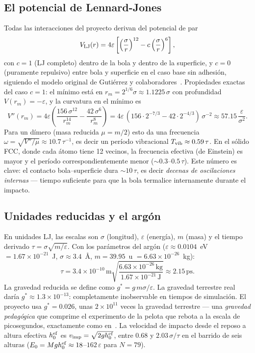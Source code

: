 \documentclass[11pt,a4paper]{article}
\newcommand{\eps}{\varepsilon}
\begin{document}
\subsection{El potencial de Lennard-Jones}
Todas las interacciones del proyecto derivan del potencial de par
\begin{equation}
V_{\rm LJ}(r) = 4\eps\left[\left(\frac{\sigma}{r}\right)^{12}
- c\left(\frac{\sigma}{r}\right)^{6}\right],
\label{eq:lj}
\end{equation}
con $c=1$ (LJ completo) dentro de la bola y dentro de la superficie, y
$c=0$ (puramente repulsivo) entre bola y superficie en el caso base sin
adhesión, siguiendo el modelo original de Gutiérrez y
colaboradores~\cite{Gutierrez2012}. Propiedades exactas del caso $c=1$:
el mínimo está en $r_m = 2^{1/6}\sigma \approx 1.1225\,\sigma$ con
profundidad $V(r_m) = -\eps$, y la curvatura en el mínimo es
\begin{equation}
V''(r_m) = 4\eps\left(\frac{156\,\sigma^{12}}{r_m^{14}}
- \frac{42\,\sigma^{6}}{r_m^{8}}\right)
= 4\eps\,(156\cdot 2^{-7/3} - 42\cdot 2^{-4/3})\,\sigma^{-2}
\approx 57.15\,\frac{\eps}{\sigma^2}.
\label{eq:curvatura}
\end{equation}
Para un dímero (masa reducida $\mu = m/2$) esto da una frecuencia
$\omega = \sqrt{V''/\mu} \approx 10.7\,\tau^{-1}$, es decir un período
vibracional $T_{\rm vib} \approx 0.59\,\tau$. En el sólido FCC, donde cada
átomo tiene 12 vecinos, la frecuencia efectiva (de Einstein) es mayor y el
período correspondientemente menor ($\sim0.3$--$0.5\,\tau$). Este número es
clave: el contacto bola--superficie dura $\sim10\,\tau$, es decir
\emph{decenas de oscilaciones internas} --- tiempo suficiente para que la
bola termalice internamente durante el impacto.

\subsection{Unidades reducidas y el argón}
En unidades LJ, las escalas son $\sigma$ (longitud), $\eps$ (energía),
$m$ (masa) y el tiempo derivado $\tau = \sigma\sqrt{m/\eps}$. Con los
parámetros del argón ($\eps \approx 0.0104$~eV $= 1.67\times10^{-21}$~J,
$\sigma \approx 3.4$~\AA, $m = 39.95$~u $= 6.63\times10^{-26}$~kg):
\begin{equation}
\tau = 3.4\times10^{-10}\,\text{m}
\sqrt{\frac{6.63\times10^{-26}\,\text{kg}}{1.67\times10^{-21}\,\text{J}}}
\approx 2.15\,\text{ps}.
\end{equation}
La gravedad reducida se define como $g^* = g\,m\sigma/\eps$. La gravedad
terrestre real daría $g^* \approx 1.3\times10^{-13}$: completamente
inobservable en tiempos de simulación. El proyecto usa $g^* = 0.026$, unas
$2\times10^{11}$ veces la gravedad terrestre --- una \emph{gravedad
pedagógica} que comprime el experimento de la pelota que rebota a la escala
de picosegundos, exactamente como en~\cite{Gutierrez2012}. La velocidad de
impacto desde el reposo a altura efectiva $h_0^{\rm ef}$ es
$v_{\rm imp} = \sqrt{2g h_0^{\rm ef}}$, entre $0.68$ y $2.03\,\sigma/\tau$
en el barrido de seis alturas ($E_0 = Mgh_0^{\rm ef} \approx 18$--$162\,\eps$
para $N=79$).
\end{document}
